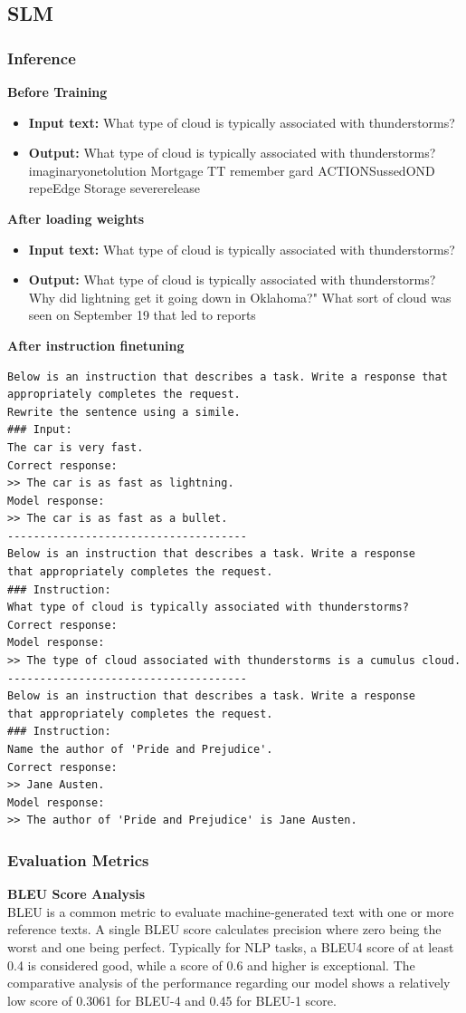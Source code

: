 \subsection{SLM}
\subsubsection{Inference}
\textbf{Before Training}
\begin{itemize}
    \item \textbf{Input text:} What type of cloud is typically associated with thunderstorms?
    \item \textbf{Output:} What type of cloud is typically associated with thunderstorms? imaginaryonetolution Mortgage TT remember gard ACTIONSussedOND repeEdge Storage severerelease
\end{itemize}

\textbf{After loading weights}
\begin{itemize}
    \item \textbf{Input text:} What type of cloud is typically associated with thunderstorms?
    \item \textbf{Output:} What type of cloud is typically associated with thunderstorms? Why did lightning get it going down in Oklahoma?" What sort of cloud was seen on September 19 that led to reports
\end{itemize}

\textbf{After instruction finetuning}
\begin{verbatim}
Below is an instruction that describes a task. Write a response that 
appropriately completes the request.
Rewrite the sentence using a simile.
### Input:
The car is very fast.
Correct response:
>> The car is as fast as lightning.
Model response:
>> The car is as fast as a bullet.
-------------------------------------
Below is an instruction that describes a task. Write a response 
that appropriately completes the request.
### Instruction:
What type of cloud is typically associated with thunderstorms?
Correct response:
Model response:
>> The type of cloud associated with thunderstorms is a cumulus cloud.
-------------------------------------
Below is an instruction that describes a task. Write a response 
that appropriately completes the request.
### Instruction:
Name the author of 'Pride and Prejudice'.
Correct response:
>> Jane Austen.
Model response:
>> The author of 'Pride and Prejudice' is Jane Austen.
\end{verbatim}

\subsubsection{Evaluation Metrics}
\textbf{BLEU Score Analysis}\\
BLEU is a common metric to evaluate machine‐generated text with one or more
reference texts. A single BLEU score calculates precision where zero being the worst and
one being perfect. Typically for NLP tasks, a BLEU4 score of at least 0.4 is
considered good, while a score of 0.6 and higher is exceptional. The comparative analysis of the performance regarding our model shows a relatively low score of 0.3061 for BLEU-4 and 0.45 for BLEU-1 score.

